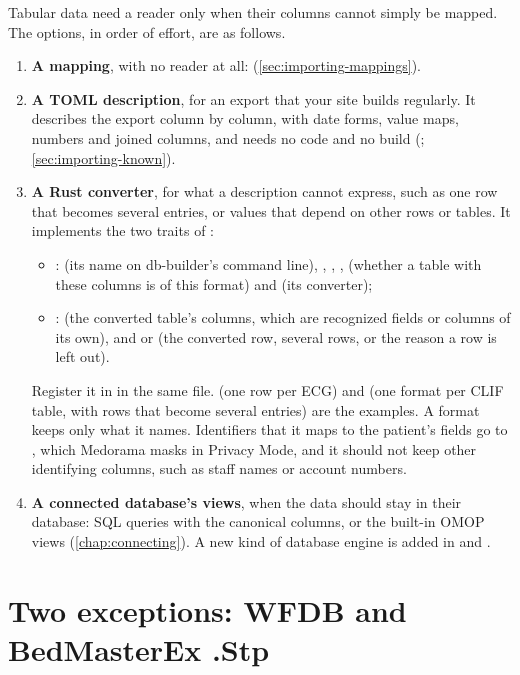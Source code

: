 Tabular data need a reader only when their columns cannot simply be mapped. The options, in order
of effort, are as follows.
\begin{enumerate}
\item \textbf{A mapping}, with no reader at all: 
  (\cref{sec:importing-mappings}).
\item \textbf{A TOML description}, for an export that your site builds regularly. It describes
  the export column by column, with date forms, value maps, numbers and joined columns, and needs
  no code and no build (; \cref{sec:importing-known}).
\item \textbf{A Rust converter}, for what a description cannot express, such as one row that
  becomes several entries, or values that depend on other rows or tables. It implements the two
  traits of :
  \begin{itemize}
  \item {}:  (its name on db-builder's command line), ,
    , ,  (whether a table with these columns is
    of this format) and  (its converter);
  \item {}:  (the converted table's columns, which are recognized
    fields or columns of its own), and  or  (the converted
    row, several rows, or the reason a row is left out).
  \end{itemize}
  Register it in  in the same file.  (one row per ECG) and
   (one format per CLIF table, with rows that become several entries) are the
  examples. A format keeps only what it names. Identifiers that it maps to the patient's fields
  go to , which Medorama masks in Privacy Mode, and it should not keep other
  identifying columns, such as staff names or account numbers.
\item \textbf{A connected database's views}, when the data should stay in their database: SQL
  queries with the canonical columns, or the built-in OMOP views (\cref{chap:connecting}). A
  new kind of database engine is added in  and
  .
\end{enumerate}

\section{Two exceptions: WFDB and BedMasterEx .Stp}
\label{sec:readers-exceptions}


